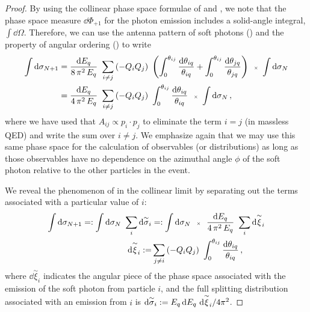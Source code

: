 \begin{proof}
    By using the collinear phase space formulae of  and , we note that the phase space measure \(\dd\Phi_{+1}\) for the photon emission includes a solid-angle integral, \(\int \dd\Omega\).
    Therefore, we can use the antenna pattern of soft photons () and the property of angular ordering () to write
   \begin{align}
       \int
       \dd\sigma_{N+1}
       &=
       \frac{\dd E_q}{8\,\pi^2\, E_q}
       \,\,
       \sum_{i\neq j}
       \left(-Q_i Q_j\right)
       \,\,
       \left(
           \int_0^{\theta_{ij}} \frac{\dd\theta_{iq}}{\theta_{iq}}
           +
           \int_0^{\theta_{ij}} \frac{\dd\theta_{jq}}{\theta_{jq}}
       \right)
       \,\,\,
       {\scriptscriptstyle\times}
       \,\,
       \int
       \dd\sigma_N
       \\
       &=
       \frac{\dd E_q}{4\,\pi^2 \, E_q}
       \,\,
       \sum_{i\neq j}
       \left(-Q_i Q_j\right)
       \,\,
       \int_0^{\theta_{ij}} \frac{\dd\theta_{iq}}{\theta_{iq}}
       \,\,\,\,
       {\scriptscriptstyle\times}
       \,\,
       \int
       \dd\sigma_N
       \,,
   \end{align}
    where we have used that \(A_{ij} \propto p_i \cdot p_j\) to eliminate the term \(i = j\) (in massless QED) and write the sum over \(i \neq j\).
   We emphasize again that we may use this same phase space for the calculation of observables (or distributions) as long as those observables have no dependence on the azimuthal angle \(\phi\) of the soft photon relative to the other particles in the event.

   We reveal the phenomenon of  in the collinear limit by separating out the terms associated with a particular value of \(i\):
   \begin{align}
       \label{eq:charge-coherence-sum}
       \int
       \dd \sigma_{N+1}
       =:
       \int \dd \sigma_N
       \,\,
       \sum_i
       \dsigmatilde_i
       &=:
       \int \dd \sigma_N
       \,\,\,\,
       {\scriptscriptstyle\times}
       \,\,\,\,
       \frac{\dd E_q}{4\,\pi^2\, E_q}
       \,\,
       \sum_i \dd\overset{\sim}{\xi}_i
       \\
       \dd\overset{\sim}{\xi}_i
       :=&
       \sum_{j \neq i}
       \le(-Q_i Q_j\ri)
       \,\,
       \int_0^{\theta_{ij}} \frac{\dd\theta_{iq}}{\theta_{iq}}
       \,,
   \end{align}
   where \(\dd\overset{\sim}{\xi}_i\) indicates the angular piece of the phase space associated with the emission of the soft photon from particle \(i\), and the full splitting distribution associated with an emission from \(i\) is \(\dd\overset{\sim}{\sigma}_i := E_q \, \dd E_q \,\, \dd\overset{\sim}{\xi}_i / 4 \pi^2\).


\end{proof}
